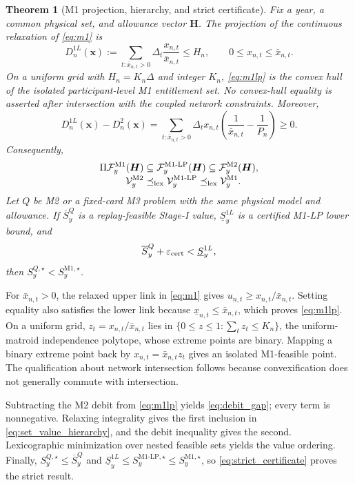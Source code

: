 \documentclass[10pt,journal]{IEEEtran}
\newtheorem{theorem}{Theorem}
\newcommand{\Mone}{\ensuremath{\mathrm{M1}}}
\newcommand{\MoneLP}{\ensuremath{\mathrm{M1\text{-}LP}}}
\newcommand{\Mtwo}{\ensuremath{\mathrm{M2}}}
\newcommand{\lexleq}{\preceq_{\mathrm{lex}}}
\begin{document}
\begin{theorem}[M1 projection, hierarchy, and strict certificate]
\label{thm:hierarchy}
Fix a year, a common physical set, and allowance vector $\bm H$. The projection of the continuous relaxation of \eqref{eq:m1} is
\begin{equation}
D_n^{1L}(\bm x):=
\sum_{t:\bar x_{n,t}>0}\Delta_t
\frac{x_{n,t}}{\bar x_{n,t}}
\leq H_n,
\qquad 0\leq x_{n,t}\leq\bar x_{n,t}.
\label{eq:m1lp}
\end{equation}
On a uniform grid with $H_n=K_n\Delta$ and integer $K_n$, \eqref{eq:m1lp} is the convex hull of the isolated participant-level M1 entitlement set. No convex-hull equality is asserted after intersection with the coupled network constraints. Moreover,
\begin{equation}
D_n^{1L}(\bm x)-D_n^2(\bm x)
=\sum_{t:\bar x_{n,t}>0}\Delta_t x_{n,t}
\left(\frac{1}{\bar x_{n,t}}-\frac{1}{P_n}\right)
\geq0.
\label{eq:debit_gap}
\end{equation}
Consequently,
\begin{align}
\Pi\mathcal F_y^{\Mone}(\bm H)
&\subseteq
\mathcal F_y^{\MoneLP}(\bm H)
\subseteq
\mathcal F_y^{\Mtwo}(\bm H),
\notag\\[-1mm]
\mathcal V_y^{\Mtwo}
&\lexleq
\mathcal V_y^{\MoneLP}
\lexleq
\mathcal V_y^{\Mone}.
\label{eq:set_value_hierarchy}
\end{align}
Let $Q$ be M2 or a fixed-card M3 problem with the same physical model and allowance. If $\overline S_y^Q$ is a replay-feasible Stage-I value, $\underline S_y^{1L}$ is a certified M1-LP lower bound, and
\begin{equation}
\overline S_y^Q+\varepsilon_{\rm cert}
<\underline S_y^{1L},
\label{eq:strict_certificate}
\end{equation}
then $S_y^{Q,\star}<S_y^{\Mone,\star}$.
\end{theorem}

\begin{IEEEproof}
For $\bar x_{n,t}>0$, the relaxed upper link in \eqref{eq:m1} gives $u_{n,t}\geq x_{n,t}/\bar x_{n,t}$. Setting equality also satisfies the lower link because $\underline x_{n,t}\leq\bar x_{n,t}$, which proves \eqref{eq:m1lp}. On a uniform grid, $z_t=x_{n,t}/\bar x_{n,t}$ lies in $\{0\leq z\leq1:\sum_tz_t\leq K_n\}$, the uniform-matroid independence polytope, whose extreme points are binary. Mapping a binary extreme point back by $x_{n,t}=\bar x_{n,t}z_t$ gives an isolated M1-feasible point. The qualification about network intersection follows because convexification does not generally commute with intersection.

Subtracting the M2 debit from \eqref{eq:m1lp} yields \eqref{eq:debit_gap}; every term is nonnegative. Relaxing integrality gives the first inclusion in \eqref{eq:set_value_hierarchy}, and the debit inequality gives the second. Lexicographic minimization over nested feasible sets yields the value ordering. Finally, $S_y^{Q,\star}\leq\overline S_y^Q$ and $\underline S_y^{1L}\leq S_y^{\MoneLP,\star}\leq S_y^{\Mone,\star}$, so \eqref{eq:strict_certificate} proves the strict result.
\end{IEEEproof}
\end{document}
